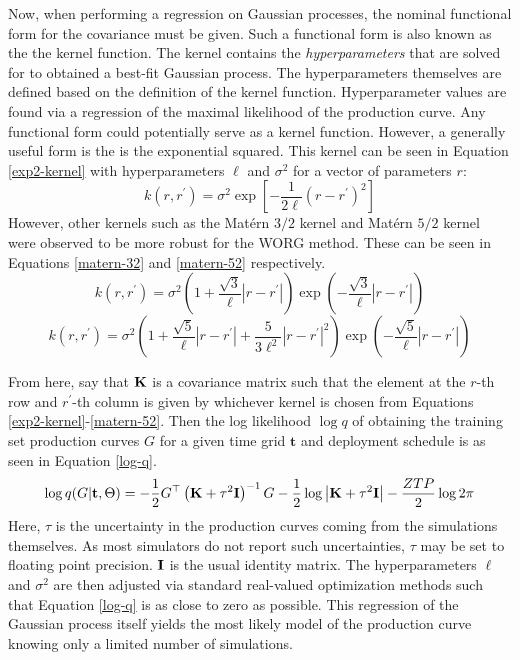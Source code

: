 Now, when performing a regression on Gaussian processes,
the nominal functional form for the covariance must be given.
Such a functional form is also known as the the kernel function.
The kernel contains the \emph{hyperparameters} that are solved for to
obtained a best-fit Gaussian process. The hyperparameters themselves are
defined based on the definition of the kernel function. Hyperparameter
values are found via a regression of the maximal likelihood of
the production curve. Any functional form could potentially serve as a kernel
function. However, a generally useful form is the is the exponential
squared. This kernel can be seen in Equation \ref{exp2-kernel} with
hyperparameters $\ell$ and $\sigma^2$ for a vector of parameters $r$:
\begin{equation}
\label{exp2-kernel}
k(r, r^\prime) = \sigma^2 \exp\left[-\frac{1}{2\ell}(r - r^\prime)^2 \right]
\end{equation}
However, other kernels such as the Mat\'ern $3/2$ kernel and Mat\'ern $5/2$
kernel \cite{paciorek2004nonstationary} were observed to be more robust for
the WORG method. These can be seen in Equations \ref{matern-32} and
\ref{matern-52} respectively.
\begin{equation}
\label{matern-32}
k(r, r^\prime) = \sigma^2
                 \left(1 + \frac{\sqrt{3}}{\ell}|r - r^\prime|\right)
                 \exp\left(-\frac{\sqrt{3}}{\ell}|r - r^\prime|\right)
\end{equation}
\begin{equation}
\label{matern-52}
k(r, r^\prime) = \sigma^2
                 \left(1 + \frac{\sqrt{5}}{\ell}|r - r^\prime|
                         + \frac{5}{3\ell^2}|r - r^\prime|^2\right)
                 \exp\left(-\frac{\sqrt{5}}{\ell}|r - r^\prime|\right)
\end{equation}

From here, say that $\mathbf{K}$ is a covariance matrix
such that the element at the $r$-th row and $r^\prime$-th column is
given by whichever kernel is chosen from
Equations \ref{exp2-kernel}-\ref{matern-52}. Then the
log likelihood $\log q$ of obtaining the training set production curves
$G$ for a given time grid $\mathbf{t}$ and deployment schedule is as
seen in Equation \ref{log-q}.
\begin{equation}
\label{log-q}
\log q(G|\mathbf{t}, \Theta)
    = -\frac{1}{2}G^\top\left(\mathbf{K} + \tau^2\mathbf{I}\right)^{-1}G
      -\frac{1}{2}\log\left|\mathbf{K} + \tau^2\mathbf{I}\right|
      -\frac{ZTP}{2}\log 2\pi
\end{equation}
Here, $\tau$ is the uncertainty in the production curves coming from the
simulations themselves. As most simulators do not report such uncertainties,
$\tau$ may be set to floating point precision. $\mathbf{I}$ is the usual identity
matrix. The hyperparameters $\ell$ and $\sigma^2$ are then adjusted via
standard real-valued optimization methods such that Equation \ref{log-q} is
as close to zero as possible.
This regression of the Gaussian process itself yields the most likely
model of the production curve knowing only a limited number of simulations.

